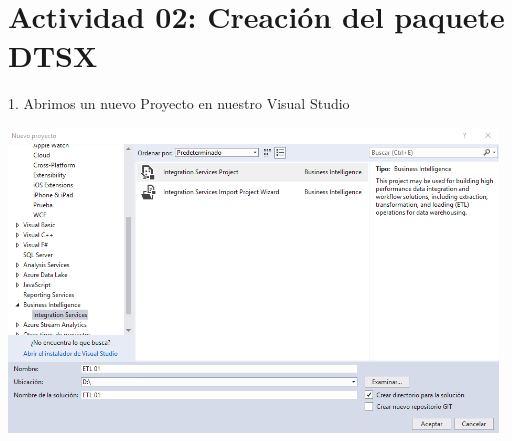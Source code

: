 \section{Actividad 02: Creación del  paquete DTSX} 


1. Abrimos un nuevo Proyecto en nuestro Visual Studio\\
	\begin{center}
	\includegraphics[width=13cm]{./Imagenes/img13}
	\end{center}	

